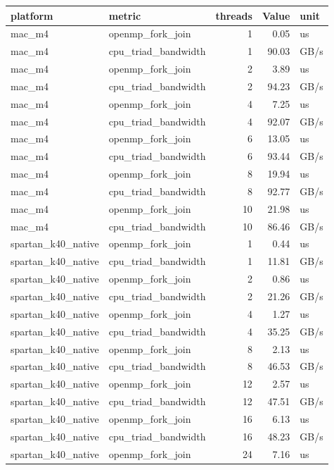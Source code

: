 \begin{tabular}{llrrl}
\toprule
platform & metric & threads & Value & unit \\
\midrule
mac\_m4 & openmp\_fork\_join & 1 & 0.05 & us \\
mac\_m4 & cpu\_triad\_bandwidth & 1 & 90.03 & GB/s \\
mac\_m4 & openmp\_fork\_join & 2 & 3.89 & us \\
mac\_m4 & cpu\_triad\_bandwidth & 2 & 94.23 & GB/s \\
mac\_m4 & openmp\_fork\_join & 4 & 7.25 & us \\
mac\_m4 & cpu\_triad\_bandwidth & 4 & 92.07 & GB/s \\
mac\_m4 & openmp\_fork\_join & 6 & 13.05 & us \\
mac\_m4 & cpu\_triad\_bandwidth & 6 & 93.44 & GB/s \\
mac\_m4 & openmp\_fork\_join & 8 & 19.94 & us \\
mac\_m4 & cpu\_triad\_bandwidth & 8 & 92.77 & GB/s \\
mac\_m4 & openmp\_fork\_join & 10 & 21.98 & us \\
mac\_m4 & cpu\_triad\_bandwidth & 10 & 86.46 & GB/s \\
spartan\_k40\_native & openmp\_fork\_join & 1 & 0.44 & us \\
spartan\_k40\_native & cpu\_triad\_bandwidth & 1 & 11.81 & GB/s \\
spartan\_k40\_native & openmp\_fork\_join & 2 & 0.86 & us \\
spartan\_k40\_native & cpu\_triad\_bandwidth & 2 & 21.26 & GB/s \\
spartan\_k40\_native & openmp\_fork\_join & 4 & 1.27 & us \\
spartan\_k40\_native & cpu\_triad\_bandwidth & 4 & 35.25 & GB/s \\
spartan\_k40\_native & openmp\_fork\_join & 8 & 2.13 & us \\
spartan\_k40\_native & cpu\_triad\_bandwidth & 8 & 46.53 & GB/s \\
spartan\_k40\_native & openmp\_fork\_join & 12 & 2.57 & us \\
spartan\_k40\_native & cpu\_triad\_bandwidth & 12 & 47.51 & GB/s \\
spartan\_k40\_native & openmp\_fork\_join & 16 & 6.13 & us \\
spartan\_k40\_native & cpu\_triad\_bandwidth & 16 & 48.23 & GB/s \\
spartan\_k40\_native & openmp\_fork\_join & 24 & 7.16 & us \\

\end{tabular}
